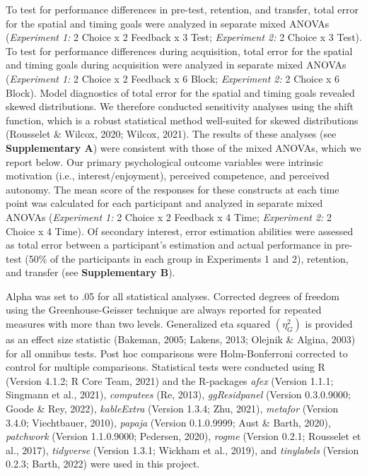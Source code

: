 \documentclass[
  doc, donotrepeattitle,floatsintext]{apa7}
\begin{document}
To test for performance differences in pre-test, retention, and transfer, total error for the spatial and timing goals were analyzed in separate mixed ANOVAs (\emph{Experiment 1:} 2 Choice x 2 Feedback x 3 Test; \emph{Experiment 2:} 2 Choice x 3 Test). To test for performance differences during acquisition, total error for the spatial and timing goals during acquisition were analyzed in separate mixed ANOVAs (\emph{Experiment 1:} 2 Choice x 2 Feedback x 6 Block; \emph{Experiment 2:} 2 Choice x 6 Block). Model diagnostics of total error for the spatial and timing goals revealed skewed distributions. We therefore conducted sensitivity analyses using the shift function, which is a robust statistical method well-suited for skewed distributions (Rousselet \& Wilcox, 2020; Wilcox, 2021). The results of these analyses (see \textbf{Supplementary A}) were consistent with those of the mixed ANOVAs, which we report below. Our primary psychological outcome variables were intrinsic motivation (i.e., interest/enjoyment), perceived competence, and perceived autonomy. The mean score of the responses for these constructs at each time point was calculated for each participant and analyzed in separate mixed ANOVAs (\emph{Experiment 1:} 2 Choice x 2 Feedback x 4 Time; \emph{Experiment 2:} 2 Choice x 4 Time). Of secondary interest, error estimation abilities were assessed as total error between a participant's estimation and actual performance in pre-test (50\% of the participants in each group in Experiments 1 and 2), retention, and transfer (see \textbf{Supplementary B}).

Alpha was set to .05 for all statistical analyses. Corrected degrees of freedom using the Greenhouse-Geisser technique are always reported for repeated measures with more than two levels. Generalized eta squared \((\eta_{G}^2)\) is provided as an effect size statistic (Bakeman, 2005; Lakens, 2013; Olejnik \& Algina, 2003) for all omnibus tests. Post hoc comparisons were Holm-Bonferroni corrected to control for multiple comparisons. Statistical tests were conducted using R (Version 4.1.2; R Core Team, 2021) and the R-packages \emph{afex} (Version 1.1.1; Singmann et al., 2021), \emph{computees} (Re, 2013), \emph{ggResidpanel} (Version 0.3.0.9000; Goode \& Rey, 2022), \emph{kableExtra} (Version 1.3.4; Zhu, 2021), \emph{metafor} (Version 3.4.0; Viechtbauer, 2010), \emph{papaja} (Version 0.1.0.9999; Aust \& Barth, 2020), \emph{patchwork} (Version 1.1.0.9000; Pedersen, 2020), \emph{rogme} (Version 0.2.1; Rousselet et al., 2017), \emph{tidyverse} (Version 1.3.1; Wickham et al., 2019), and \emph{tinylabels} (Version 0.2.3; Barth, 2022) were used in this project.
\end{document}
